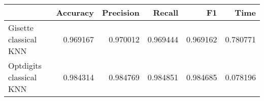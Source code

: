 \begin{tabular}{lrrrrr}
\toprule
{} &  Accuracy &  Precision &    Recall &        F1 &      Time \\
\midrule
Gisette classical KNN   &  0.969167 &   0.970012 &  0.969444 &  0.969162 &  0.780771 \\
Optdigits classical KNN &  0.984314 &   0.984769 &  0.984851 &  0.984685 &  0.078196 \\
\bottomrule
\end{tabular}
